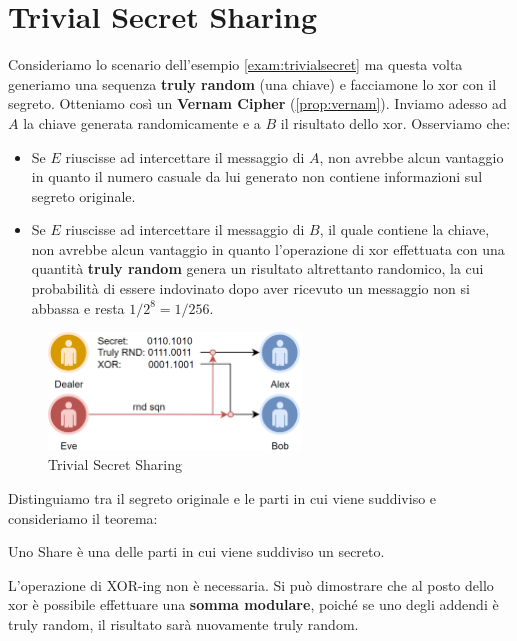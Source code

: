 \section{Trivial Secret Sharing}
\begin{example}
Consideriamo lo scenario dell'esempio \ref{exam:trivialsecret} ma questa volta generiamo una sequenza \textbf{truly random} (una chiave) e facciamone lo xor con il segreto. Otteniamo così un \textbf{Vernam Cipher} (\cref{prop:vernam}). Inviamo adesso ad $A$ la chiave generata randomicamente e a $B$ il risultato dello xor. Osserviamo che:\\
\begin{itemize}
    \item Se $E$ riuscisse ad intercettare il messaggio di $A$, non avrebbe alcun vantaggio in quanto il numero casuale da lui generato non contiene informazioni sul segreto originale.
    \item Se $E$ riuscisse ad intercettare il messaggio di $B$, il quale contiene la chiave, non avrebbe alcun vantaggio in quanto l'operazione di xor effettuata con una quantità \textbf{truly random} genera un risultato altrettanto randomico, la cui probabilità di essere indovinato dopo aver ricevuto un messaggio non si abbassa e resta $1/2^8=1/256$.
\end{itemize}
\end{example}
\begin{figure}[ht]
    \centering
    \includegraphics[width=0.6\textwidth]{image/secret_sharing/trivialsecret.png}
    \caption{Trivial Secret Sharing}
    \label{fig:trivialsecret}
\end{figure}
Distinguiamo tra il segreto originale e le parti in cui viene suddiviso e consideriamo il teorema:
\begin{definition}[Shares]\label{def:shares}
Uno Share è una delle parti in cui viene suddiviso un secreto.
\end{definition}\pagebreak
\begin{theorem}
L'operazione di XOR-ing non è necessaria. Si può dimostrare che al posto dello xor è possibile effettuare una \textbf{somma modulare}, poiché se uno degli addendi è truly random, il risultato sarà nuovamente truly random.
\end{theorem}
